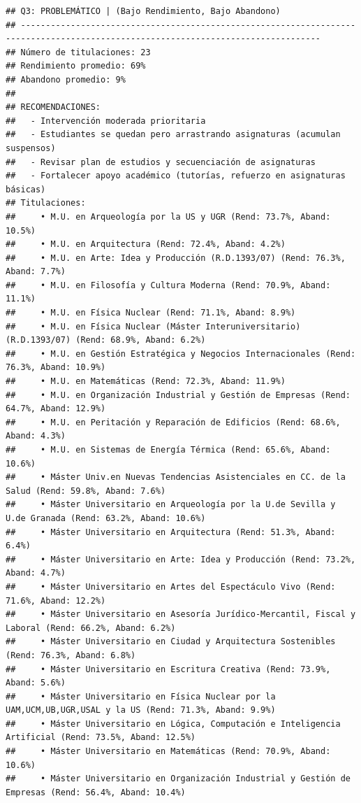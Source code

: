 \documentclass[
]{article}
\begin{document}
\begin{verbatim}
## Q3: PROBLEMÁTICO | (Bajo Rendimiento, Bajo Abandono)
## ---------------------------------------------------------------------------------------------------------------------------------- 
## Número de titulaciones: 23 
## Rendimiento promedio: 69% 
## Abandono promedio: 9% 
## 
## RECOMENDACIONES:
##   - Intervención moderada prioritaria
##   - Estudiantes se quedan pero arrastrando asignaturas (acumulan suspensos)
##   - Revisar plan de estudios y secuenciación de asignaturas
##   - Fortalecer apoyo académico (tutorías, refuerzo en asignaturas básicas)
## Titulaciones:
##     • M.U. en Arqueología por la US y UGR (Rend: 73.7%, Aband: 10.5%)
##     • M.U. en Arquitectura (Rend: 72.4%, Aband: 4.2%)
##     • M.U. en Arte: Idea y Producción (R.D.1393/07) (Rend: 76.3%, Aband: 7.7%)
##     • M.U. en Filosofía y Cultura Moderna (Rend: 70.9%, Aband: 11.1%)
##     • M.U. en Física Nuclear (Rend: 71.1%, Aband: 8.9%)
##     • M.U. en Física Nuclear (Máster Interuniversitario) (R.D.1393/07) (Rend: 68.9%, Aband: 6.2%)
##     • M.U. en Gestión Estratégica y Negocios Internacionales (Rend: 76.3%, Aband: 10.9%)
##     • M.U. en Matemáticas (Rend: 72.3%, Aband: 11.9%)
##     • M.U. en Organización Industrial y Gestión de Empresas (Rend: 64.7%, Aband: 12.9%)
##     • M.U. en Peritación y Reparación de Edificios (Rend: 68.6%, Aband: 4.3%)
##     • M.U. en Sistemas de Energía Térmica (Rend: 65.6%, Aband: 10.6%)
##     • Máster Univ.en Nuevas Tendencias Asistenciales en CC. de la Salud (Rend: 59.8%, Aband: 7.6%)
##     • Máster Universitario en Arqueología por la U.de Sevilla y U.de Granada (Rend: 63.2%, Aband: 10.6%)
##     • Máster Universitario en Arquitectura (Rend: 51.3%, Aband: 6.4%)
##     • Máster Universitario en Arte: Idea y Producción (Rend: 73.2%, Aband: 4.7%)
##     • Máster Universitario en Artes del Espectáculo Vivo (Rend: 71.6%, Aband: 12.2%)
##     • Máster Universitario en Asesoría Jurídico-Mercantil, Fiscal y Laboral (Rend: 66.2%, Aband: 6.2%)
##     • Máster Universitario en Ciudad y Arquitectura Sostenibles (Rend: 76.3%, Aband: 6.8%)
##     • Máster Universitario en Escritura Creativa (Rend: 73.9%, Aband: 5.6%)
##     • Máster Universitario en Física Nuclear por la UAM,UCM,UB,UGR,USAL y la US (Rend: 71.3%, Aband: 9.9%)
##     • Máster Universitario en Lógica, Computación e Inteligencia Artificial (Rend: 73.5%, Aband: 12.5%)
##     • Máster Universitario en Matemáticas (Rend: 70.9%, Aband: 10.6%)
##     • Máster Universitario en Organización Industrial y Gestión de Empresas (Rend: 56.4%, Aband: 10.4%)
\end{verbatim}
\end{document}
